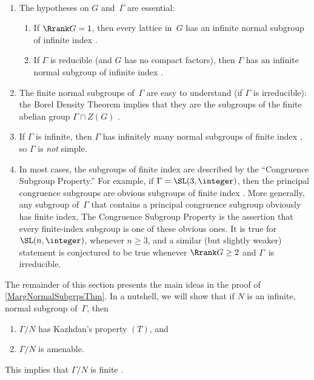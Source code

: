 \begin{rems} \label{MargNormSubgrpRems} \ 
\noprelistbreak
\begin{enumerate}
\item The hypotheses on $G$ and~$\Gamma$ are essential:
	\noprelistbreak
	\begin{enumerate}
	\item If $\Rrank G = 1$, then every lattice in~$G$ has an infinite normal subgroup of infinite index . 
	\item \label{MargNormSubgrpRems-hyp-red}
	If $\Gamma$ is reducible (and $G$ has no compact factors), then $\Gamma$ has an infinite normal subgroup of infinite index .
	\end{enumerate}
\item The finite normal subgroups of~$\Gamma$ are easy to understand (if $\Gamma$ is irreducible): the Borel Density Theorem implies that they are the subgroups of the finite abelian group $\Gamma \cap Z(G)$ .
\item \label{MargNormSubgrpRems-finind}
If $\Gamma$ is infinite, then $\Gamma$ has infinitely many normal subgroups of finite index , so $\Gamma$ is \emph{not} simple.

\item \label{MargNormSubgrpRems-CSP}
In most cases, the subgroups of finite index are described by the ``Congruence Subgroup Property\zz.'' For example, if $\Gamma = \SL(3,\integer)$, then the principal congruence subgroups are obvious subgroups of finite index . More generally, any subgroup of~$\Gamma$ that contains a principal congruence subgroup obviously has finite index. The Congruence Subgroup Property is the assertion that every finite-index subgroup is one of these obvious ones. It is true for $\SL(n,\integer)$, whenever $n \ge 3$, and a similar (but slightly weaker) statement is conjectured to be true whenever $\Rrank G \ge 2$ and $\Gamma$~is irreducible.
\end{enumerate}
\end{rems}




The remainder of this section presents the main ideas in the proof of \cref{MargNormalSubgrpsThm}. In a nutshell, we will show that if $N$ is an infinite, normal subgroup of~$\Gamma$, then
	\begin{enumerate}
	\item $\Gamma/N$ has Kazhdan's property $(T)$,
	and
	\item $\Gamma/N$ is amenable.
	\end{enumerate}
This implies that $\Gamma/N$ is finite .

